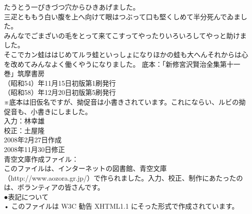 \documentclass[
a4paper,
10pt,
book]
{tarticle}
\begin{document}
たうとう一ぴきづつ穴からひきあげました。\\
\indent 三疋とももう白い腹を上へ向けて眼はつぶって口も堅くしめて半分死んでゐました。\\
\indent みんなでごまざいの毛をとって来てこすってやったりいろいろしてやっと助けました。\\
\indent そこでカン蛙ははじめてルラ蛙といっしょになりほかの蛙も大へんそれからは心を改めてみんなよく働くやうになりました。
\newpage
底本：「新修宮沢賢治全集\indent 第十一巻」筑摩書房\\
\indent \indent {}（昭和54）年11月15日初版第1刷発行\\
\indent \indent {}（昭和58）年12月20日初版第5刷発行\\
※底本は旧仮名ですが、拗促音は小書きされています。これにならい、ルビの拗促音も、小書きにしました。\\
入力：林\indent 幸雄\\
校正：土屋隆\\
2008年2月27日作成\\
2008年11月30日修正\\
青空文庫作成ファイル：\\
このファイルは、インターネットの図書館、青空文庫（http://www.aozora.gr.jp/）で作られました。入力、校正、制作にあたったのは、ボランティアの皆さんです。\\
●表記について\\
•	このファイルは W3C 勧告 XHTML1.1 にそった形式で作成されています。\\
\begin{comment}
a
\end{comment}
\end{document}
